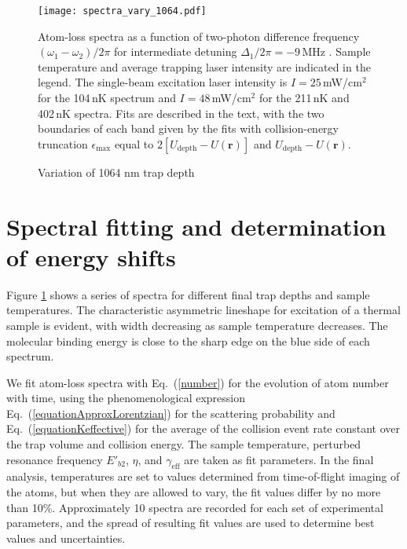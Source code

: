 \begin{figure} \label{Fig:Spectraminus9MHzVaryTrapCold}
\centerline{
  \texttt{[image: spectra\_vary\_1064.pdf]}}
  \caption{Variation of 1064 nm trap depth}{Atom-loss spectra as a function of two-photon difference frequency $(\omega_1-\omega_2)/2\pi$ for intermediate detuning
$\Delta_1/2\pi=-9$\,MHz . Sample temperature and average trapping laser intensity are indicated in the legend. The single-beam excitation laser intensity is $I=25$\,mW/cm$^{2}$ for the 104\,nK spectrum and $I=48$\,mW/cm$^{2}$ for the 211\,nK and 402\,nK spectra. Fits are described in the text, with the two boundaries of each band given by the fits with collision-energy truncation
$\epsilon_{\text{max}}$ equal to $2[U_{\text{depth}}-U(\mathbf{r})]$ and $U_{\text{depth}}-U(\mathbf{r})$.}
\end{figure}

\section{Spectral fitting and determination of energy shifts}
\label{sec:lowE_Eb2}


Figure \ref{Fig:Spectraminus9MHzVaryTrapCold} shows a series of spectra for different final trap depths and sample temperatures. The characteristic asymmetric lineshape for excitation of a thermal sample is evident, with width decreasing as sample temperature decreases. The molecular binding energy is close to the sharp edge on the blue side of each spectrum.

We fit atom-loss spectra with Eq.\ (\ref{number}) for the evolution of atom number with time, using the phenomenological expression Eq.\ (\ref{equationApproxLorentzian}) for the scattering probability and Eq.\ (\ref{equationKeffective}) for the average of the collision event rate constant over the trap volume and collision energy. The sample temperature, perturbed resonance frequency $E'_{b2}$, $\eta$, and $\gamma_{\text{eff}}$ are taken as fit parameters. In the final analysis, temperatures are set to values determined from time-of-flight imaging of the atoms, but when they are allowed to vary, the fit values differ by no more than 10\%. Approximately 10 spectra are recorded for each set of experimental parameters, and the spread of resulting fit values are used to determine best values and uncertainties.


